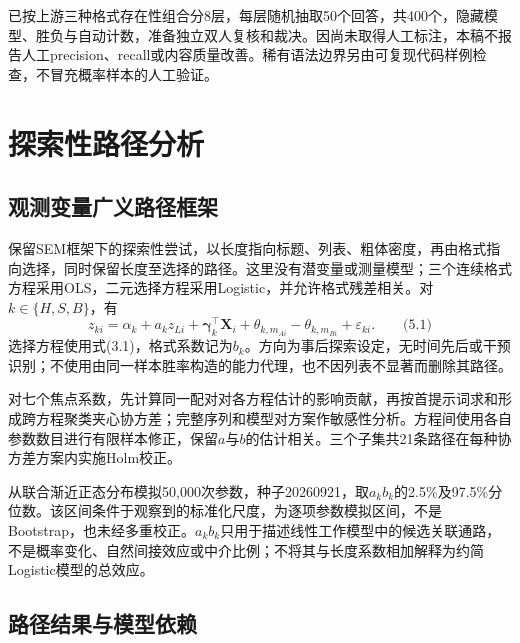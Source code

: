 \documentclass[UTF8,11pt,a4paper,fontset=windows]{ctexart}
\numberwithin{equation}{section}
\begin{document}
已按上游三种格式存在性组合分8层，每层随机抽取50个回答，共400个，隐藏模型、胜负与自动计数，准备独立双人复核和裁决。因尚未取得人工标注，本稿不报告人工precision、recall或内容质量改善。稀有语法边界另由可复现代码样例检查，不冒充概率样本的人工验证。


\section{探索性路径分析}
\subsection{观测变量广义路径框架}
保留SEM框架下的探索性尝试，以长度指向标题、列表、粗体密度，再由格式指向选择，同时保留长度至选择的路径。这里没有潜变量或测量模型；三个连续格式方程采用OLS，二元选择方程采用Logistic，并允许格式残差相关。对$k\in\{H,S,B\}$，有
\[z_{ki}=\alpha_k+a_kz_{Li}+\bm\gamma_k^\top\bm X_i
 +\theta_{k,m_{Ai}}-\theta_{k,m_{Bi}}+\varepsilon_{ki}.\qquad\text{(5.1)}\]
选择方程使用式(3.1)，格式系数记为$b_k$。方向为事后探索设定，无时间先后或干预识别；不使用由同一样本胜率构造的能力代理，也不因列表不显著而删除其路径。

对七个焦点系数，先计算同一配对对各方程估计的影响贡献，再按首提示词求和形成跨方程聚类夹心协方差；完整序列和模型对方案作敏感性分析。方程间使用各自参数数目进行有限样本修正，保留$a$与$b$的估计相关。三个子集共21条路径在每种协方差方案内实施Holm校正。

从联合渐近正态分布模拟50,000次参数，种子20260921，取$a_kb_k$的2.5\%及97.5\%分位数。该区间条件于观察到的标准化尺度，为逐项参数模拟区间，不是Bootstrap，也未经多重校正。$a_kb_k$只用于描述线性工作模型中的候选关联通路，不是概率变化、自然间接效应或中介比例；不将其与长度系数相加解释为约简Logistic模型的总效应。
\subsection{路径结果与模型依赖}
\end{document}

